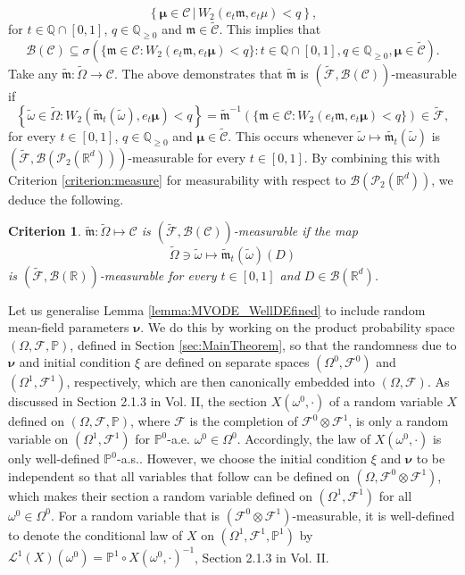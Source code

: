 \documentclass{article}
\newtheorem{criterion}{Criterion}
\newcommand{\R}{\mathbb{R}}
\begin{document}
\begin{appendices}
\[
\left\{\bm{\mu}\in \mathcal C \,|\,W_2(e_t\bm{\mathfrak{m}},e_t\bm{\mathfrak{\mu}})<q \right\},
\]
for $t\in\mathbb Q\cap [0,1]$, $q\in \mathbb Q_{\ge0}$ and $\bm{\mathfrak{m}}\in \widetilde{\mathcal C}$. This implies that
\[
  \mathcal B(\mathcal C)\subseteq\sigma \left(\{\bm{\mathfrak{m}}\in\mathcal C\colon W_2(e_t\bm{\mathfrak{m}},e_t\bm\mu)<q \} : t\in \mathbb Q \cap [0,1], q\in \mathbb Q_{\ge 0}, \bm\mu\in \widetilde{\mathcal C} \right).
\] 
Take any $\widetilde{\bm{\mathfrak{m}}}: \widetilde{\Omega}\to \mathcal C$. The above demonstrates that $\widetilde{\bm{\mathfrak{m}}}$ is $(\widetilde{\mathcal F},\mathcal B(\mathcal C))$-measurable if
\[
\left\{ \tilde\omega \in \widetilde{\Omega}:W_2(\widetilde{\mathfrak{m}}_t(\tilde{\omega}),e_t\bm\mu)< q\right\}=\widetilde{\bm{\mathfrak{m}}}^{-1}(\{\bm{\mathfrak{m}}\in \mathcal C: W_2(e_t\bm{\mathfrak{m}},e_t\bm\mu)<q \})\in \widetilde{\mathcal F},
\]
for every $t\in[0,1]$, $q\in \mathbb Q_{\ge 0}$ and $\bm{\mu}\in \widetilde{\mathcal C}$. This occurs whenever $\tilde\omega\mapsto\widetilde{\mathfrak{m}_t}(\tilde\omega)$ is $(\widetilde{\mathcal F},\mathcal B(\mathcal P_2(\R^d)))$-measurable for every $t\in [0,1]$.
By combining this with Criterion \ref{criterion:measure} for measurability with respect to $\mathcal B(\mathcal P_2(\R^d))$, we deduce the following.
\begin{criterion}\label{criterion}
$\widetilde{\bm{\mathfrak{m}}}: \widetilde{\Omega}\mapsto \mathcal C$  is $(\widetilde{\mathcal F}, \mathcal B(\mathcal C))$-measurable if the map
\[
\widetilde{\Omega}\ni \tilde{\omega}\mapsto \tilde{\mathfrak{m}}_t(\tilde{\omega})(D)
\]
is $(\widetilde{\mathcal F},\mathcal B(\R))$-measurable for every $t\in[0,1]$ and $D \in \mathcal B(\R^d)$.
\end{criterion}
Let us generalise Lemma \ref{lemma:MVODE_WellDEfined} to include random mean-field parameters $\bm{\nu}$. We do this by working on the product probability space $(\Omega,\mathcal F,\mathbb P)$, defined in Section \ref{sec:MainTheorem}, so that the randomness due to $\bm\nu$ and initial condition $\xi$ are defined on separate spaces $(\Omega^0,\mathcal F^0)$ and $(\Omega^1,\mathcal F^1)$, respectively, which are then canonically embedded into $(\Omega,\mathcal F)$. As discussed in Section 2.1.3 in \cite{carmona2018probabilistic} Vol. II, the section $X(\omega^0,\cdot)$ of a random variable $X$ defined on $(\Omega,\mathcal F,\mathbb P)$, where $\mathcal F$ is the completion of $\mathcal F^0\otimes \mathcal F^1$, is only a random variable on $(\Omega^1,\mathcal F^1)$ for $\mathbb P^0$-a.e. $\omega^0\in \Omega^0$. Accordingly, the law of $X(\omega^0,\cdot)$ is only well-defined $\mathbb P^0$-a.s.. However, we choose the initial condition $\xi$ and $\bm\nu$ to be independent so that all variables that follow can be defined on $(\Omega, \mathcal F^0\otimes \mathcal F^1)$, which makes their section a random variable defined on $(\Omega^1,\mathcal F^1)$ for all $\omega^0 \in \Omega^0$. For a random variable that is $(\mathcal F^0\otimes \mathcal F^1)$-measurable, it is well-defined to denote the conditional law of $X$ on $(\Omega^1,\mathcal F^1,\mathbb P^1)$ by $\mathcal L^1(X)(\omega^0)= \mathbb P^1\circ X(\omega^0,\cdot)^{-1}$, Section 2.1.3 in \cite{carmona2018probabilistic} Vol. II.

\end{appendices}
\end{document}
